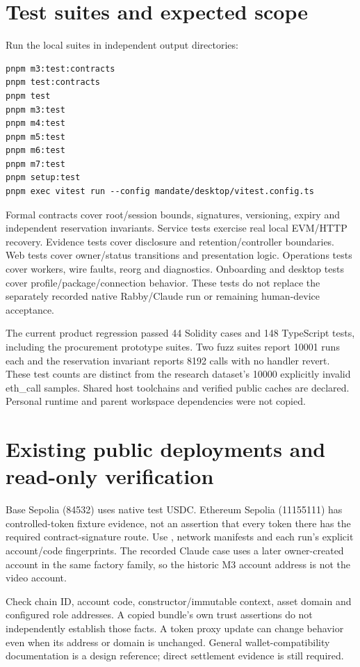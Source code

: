 \section{Test suites and expected scope}
Run the local suites in independent output directories:
\begin{lstlisting}
pnpm m3:test:contracts
pnpm test:contracts
pnpm test
pnpm m3:test
pnpm m4:test
pnpm m5:test
pnpm m6:test
pnpm m7:test
pnpm setup:test
pnpm exec vitest run --config mandate/desktop/vitest.config.ts
\end{lstlisting}
Formal contracts cover root/session bounds, signatures, versioning, expiry and independent reservation invariants. Service tests exercise real local EVM/HTTP recovery. Evidence tests cover disclosure and retention/controller boundaries. Web tests cover owner/status transitions and presentation logic. Operations tests cover workers, wire faults, reorg and diagnostics. Onboarding and desktop tests cover profile/package/connection behavior. These tests do not replace the separately recorded native Rabby/Claude run or remaining human-device acceptance.

The current product regression passed 44 Solidity cases and 148 TypeScript tests, including the procurement prototype suites. Two fuzz suites report 10001 runs each and the reservation invariant reports 8192 calls with no handler revert. These test counts are distinct from the research dataset's 10000 explicitly invalid eth\_call samples. Shared host toolchains and verified public caches are declared. Personal runtime and parent workspace dependencies were not copied.\citep{repro}

\section{Existing public deployments and read-only verification}
Base Sepolia (84532) uses native test USDC. Ethereum Sepolia (11155111) has controlled-token fixture evidence, not an assertion that every token there has the required contract-signature route. Use , network manifests and each run's explicit account/code fingerprints. The recorded Claude case uses a later owner-created account in the same factory family, so the historic M3 account address is not the video account.\citep{case}

Check chain ID, account code, constructor/immutable context, asset domain and configured role addresses. A copied bundle's own trust assertions do not independently establish those facts. A token proxy update can change behavior even when its address or domain is unchanged. General wallet-compatibility documentation is a design reference; direct settlement evidence is still required.\citep{x402compat}

